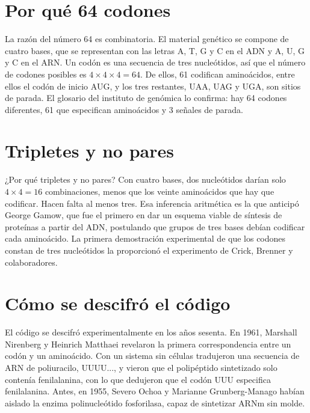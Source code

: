 \documentclass{book}
\begin{document}

\section{Por qué 64 codones}

La razón del número 64 es combinatoria. El material genético se compone de cuatro bases, que se representan con las letras A, T, G y C en el ADN y A, U, G y C en el ARN. Un codón es una secuencia de tres nucleótidos, así que el número de codones posibles es \(4 \times 4 \times 4 = 64\). De ellos, 61 codifican aminoácidos, entre ellos el codón de inicio AUG, y los tres restantes, UAA, UAG y UGA, son sitios de parada. El glosario del instituto de genómica lo confirma: hay 64 codones diferentes, 61 que especifican aminoácidos y 3 señales de parada.


\section{Tripletes y no pares}

¿Por qué tripletes y no pares? Con cuatro bases, dos nucleótidos darían solo \(4 \times 4 = 16\) combinaciones, menos que los veinte aminoácidos que hay que codificar. Hacen falta al menos tres. Esa inferencia aritmética es la que anticipó George Gamow, que fue el primero en dar un esquema viable de síntesis de proteínas a partir del ADN, postulando que grupos de tres bases debían codificar cada aminoácido. La primera demostración experimental de que los codones constan de tres nucleótidos la proporcionó el experimento de Crick, Brenner y colaboradores.


\section{Cómo se descifró el código}

El código se descifró experimentalmente en los años sesenta. En 1961, Marshall Nirenberg y Heinrich Matthaei revelaron la primera correspondencia entre un codón y un aminoácido. Con un sistema sin células tradujeron una secuencia de ARN de poliuracilo, UUUU..., y vieron que el polipéptido sintetizado solo contenía fenilalanina, con lo que dedujeron que el codón UUU especifica fenilalanina. Antes, en 1955, Severo Ochoa y Marianne Grunberg-Manago habían aislado la enzima polinucleótido fosforilasa, capaz de sintetizar ARNm sin molde.
\end{document}

